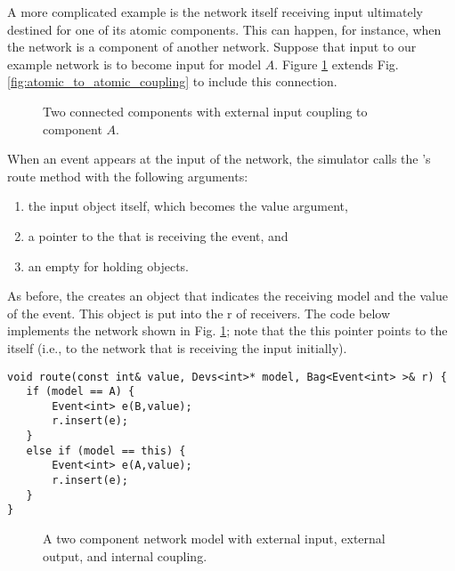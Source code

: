 A more complicated example is the network itself receiving input ultimately destined for one of its atomic components. This can happen, for instance, when the network is a component of another network. Suppose that input to our example network is to become input for  model $A$. Figure \ref{fig:eic_atomic_to_atomic_coupling} extends Fig. \ref{fig:atomic_to_atomic_coupling} to include this connection.
\begin{figure}[ht]
\centering
{}
\caption{Two connected  components with external input coupling to component $A$.}
\label{fig:eic_atomic_to_atomic_coupling}
\end{figure} 

When an event appears at the input of the network, the simulator calls the 's route method with the following arguments:
\begin{enumerate}
\item the input object itself, which becomes the value argument,
\item a pointer to the  that is receiving the event, and
\item an empty  for holding  objects.
\end{enumerate} 
As before, the  creates an  object that indicates the receiving model and the value of the event. This  object is put into the  r of receivers. The code below implements the network shown in Fig. \ref{fig:eic_atomic_to_atomic_coupling}; note that the this pointer points to the  itself (i.e., to the network that is receiving the input initially).
\begin{verbatim}
void route(const int& value, Devs<int>* model, Bag<Event<int> >& r) {
   if (model == A) {
       Event<int> e(B,value);
       r.insert(e);
   }
   else if (model == this) {
       Event<int> e(A,value);
       r.insert(e);
   }
}
\end{verbatim}
\begin{figure}[ht]
\centering
{}
\caption{A two component network model with external input, external output, and internal coupling.}
\label{fig:big_coupling}
\end{figure} 

